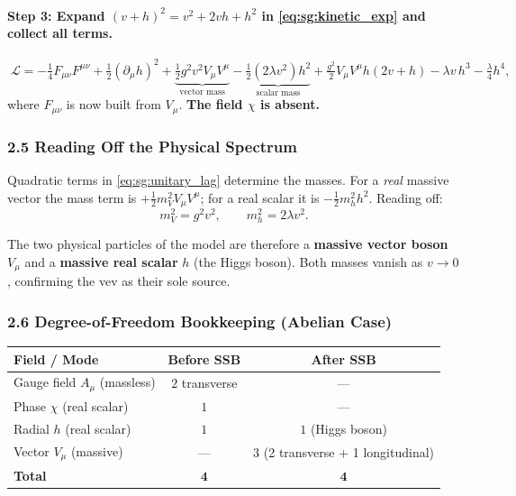 \documentclass[12pt,a4paper]{article}
\newcommand{\Lag}{\mathcal{L}}
\begin{document}
\paragraph{Step 3: Expand $(v+h)^2 = v^2 + 2vh + h^2$ in \eqref{eq:sg:kinetic_exp} and collect all terms.}
\begin{equation}
  \boxed{\;
  \Lag = -\tfrac{1}{4}F_{\mu\nu}F^{\mu\nu}
       + \tfrac{1}{2}(\partial_\mu h)^2
       + \underbrace{\tfrac{1}{2}g^2v^2 V_\mu V^\mu}_{\text{vector mass}}
       - \underbrace{\tfrac{1}{2}(2\lambda v^2)h^2}_{\text{scalar mass}}
       + \tfrac{g^2}{2}V_\mu V^\mu h(2v+h)
       - \lambda v\,h^3 - \tfrac{\lambda}{4}h^4 ,
  \;}
  \label{eq:sg:unitary_lag}
\end{equation}
where $F_{\mu\nu}$ is now built from $V_\mu$. \textbf{The field $\chi$ is absent.}

\subsubsection*{2.5 \quad Reading Off the Physical Spectrum}

Quadratic terms in \eqref{eq:sg:unitary_lag} determine the masses. For a \emph{real} massive vector the mass term is $+\tfrac{1}{2}m_V^2 V_\mu V^\mu$; for a real scalar it is $-\tfrac{1}{2}m_h^2 h^2$. Reading off:
\begin{equation}
  \boxed{\;
  m_V^2 = g^2 v^2 ,
  \qquad
  m_h^2 = 2\lambda v^2 .
  \;}
  \label{eq:sg:masses}
\end{equation}

The two physical particles of the model are therefore a \textbf{massive vector boson} $V_\mu$ and a \textbf{massive real scalar} $h$ (the Higgs boson). Both masses vanish as $v \to 0$, confirming the vev as their sole source.

\subsubsection*{2.6 \quad Degree-of-Freedom Bookkeeping (Abelian Case)}

\begin{center}
\renewcommand{\arraystretch}{1.3}
\begin{tabular}{lcc}
\toprule
Field / Mode & Before SSB & After SSB \\
\midrule
Gauge field $A_\mu$ (massless) & $2$ transverse & — \\
Phase $\chi$ (real scalar) & $1$ & — \\
Radial $h$ (real scalar) & $1$ & $1$ (Higgs boson) \\
Vector $V_\mu$ (massive) & — & $3$ (2 transverse + 1 longitudinal) \\
\midrule
\textbf{Total} & $\mathbf{4}$ & $\mathbf{4}$ \\
\bottomrule
\end{tabular}
\end{center}
\end{document}
